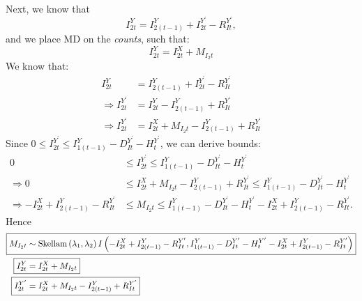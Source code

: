 \documentclass[a4paper]{article}
\begin{document}
Next, we know that
\begin{equation*}
    I^Y_{2t} = I^Y_{2(t - 1)} + I^{Y^\prime}_{2t} - R^{Y^\prime}_{It},
\end{equation*}
and we place MD on the \textit{counts}, such that:
\begin{equation*}
    I^Y_{2t} = I^X_{2t} + M_{I_2t}
\end{equation*}
We know that:
\begin{align*}
    I^Y_{2t} &= I^Y_{2(t - 1)} + I^{Y^\prime}_{2t} - R^{Y^\prime}_{It}\\
    \Rightarrow I^{Y^\prime}_{2t} &= I^Y_{2t} - I^Y_{2(t - 1)} + R^{Y^\prime}_{It}\\
    \Rightarrow I^{Y^\prime}_{2t} &= I^X_{2t} + M_{I_2t} - I^Y_{2(t - 1)} + R^{Y^\prime}_{It}
\end{align*}
Since $0 \leq I^{Y^\prime}_{2t} \leq I^Y_{1(t - 1)} - D^{Y^\prime}_{It} - H^{Y^\prime}_t$, we can derive bounds:
\begin{align*}
    0 &\leq I^{Y^\prime}_{2t} \leq I^Y_{1(t - 1)} - D^{Y^\prime}_{It} - H^{Y^\prime}_t\\
    \Rightarrow 0 &\leq I^X_{2t} + M_{I_2t} - I^Y_{2(t - 1)} + R^{Y^\prime}_{It} \leq I^Y_{1(t - 1)} - D^{Y^\prime}_{It} - H^{Y^\prime}_t\\
    \Rightarrow -I^X_{2t} + I^Y_{2(t - 1)} - R^{Y^\prime}_{It} &\leq M_{I_2t} \leq I^Y_{1(t - 1)} - D^{Y^\prime}_{It} - H^{Y^\prime}_t - I^X_{2t} + I^Y_{2(t - 1)} - R^{Y^\prime}_{It}.
\end{align*}
Hence
\begin{align*}
\Aboxed{M_{I_2t} &\sim \mbox{Skellam}\left(\lambda_1, \lambda_2\right)I\left(-I^X_{2t} + I^Y_{2(t - 1)} - R^{Y^\prime}_{It}, I^Y_{1(t - 1)} - D^{Y^\prime}_{It} - H^{Y^\prime}_t - I^X_{2t} + I^Y_{2(t - 1)} - R^{Y^\prime}_{It}\right)}\\
    \Aboxed{I^Y_{2t} &= I^X_{2t} + M_{I_2t}}\\
    \Aboxed{I^{Y^\prime}_{2t} &= I^X_{2t} + M_{I_2t} - I^Y_{2(t - 1)} + R^{Y^\prime}_{It}}
\end{align*}
\end{document}
